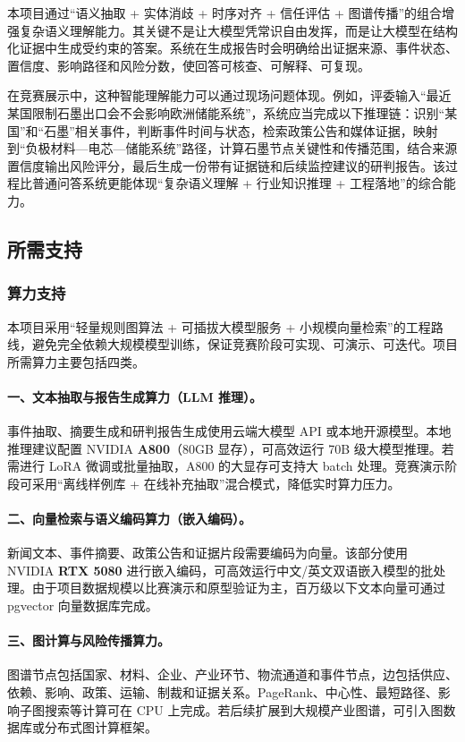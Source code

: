 ﻿\documentclass[12pt,a4paper]{article}
\begin{document}
本项目通过“语义抽取 + 实体消歧 + 时序对齐 + 信任评估 + 图谱传播”的组合增强复杂语义理解能力。其关键不是让大模型凭常识自由发挥，而是让大模型在结构化证据中生成受约束的答案。系统在生成报告时会明确给出证据来源、事件状态、置信度、影响路径和风险分数，使回答可核查、可解释、可复现。

在竞赛展示中，这种智能理解能力可以通过现场问题体现。例如，评委输入“最近某国限制石墨出口会不会影响欧洲储能系统”，系统应当完成以下推理链：识别“某国”和“石墨”相关事件，判断事件时间与状态，检索政策公告和媒体证据，映射到“负极材料—电芯—储能系统”路径，计算石墨节点关键性和传播范围，结合来源置信度输出风险评分，最后生成一份带有证据链和后续监控建议的研判报告。该过程比普通问答系统更能体现“复杂语义理解 + 行业知识推理 + 工程落地”的综合能力。

\subsection{所需支持}

\subsubsection{算力支持}

本项目采用“轻量规则图算法 + 可插拔大模型服务 + 小规模向量检索”的工程路线，避免完全依赖大规模模型训练，保证竞赛阶段可实现、可演示、可迭代。项目所需算力主要包括四类。

\paragraph{一、文本抽取与报告生成算力（LLM 推理）。}事件抽取、摘要生成和研判报告生成使用云端大模型 API 或本地开源模型。本地推理建议配置 NVIDIA \textbf{A800}（80GB 显存），可高效运行 70B 级大模型推理。若需进行 LoRA 微调或批量抽取，A800 的大显存可支持大 batch 处理。竞赛演示阶段可采用“离线样例库 + 在线补充抽取”混合模式，降低实时算力压力。

\paragraph{二、向量检索与语义编码算力（嵌入编码）。}新闻文本、事件摘要、政策公告和证据片段需要编码为向量。该部分使用 NVIDIA \textbf{RTX 5080} 进行嵌入编码，可高效运行中文/英文双语嵌入模型的批处理。由于项目数据规模以比赛演示和原型验证为主，百万级以下文本向量可通过 pgvector 向量数据库完成。

\paragraph{三、图计算与风险传播算力。}图谱节点包括国家、材料、企业、产业环节、物流通道和事件节点，边包括供应、依赖、影响、政策、运输、制裁和证据关系。PageRank、中心性、最短路径、影响子图搜索等计算可在 CPU 上完成。若后续扩展到大规模产业图谱，可引入图数据库或分布式图计算框架。
\end{document}
